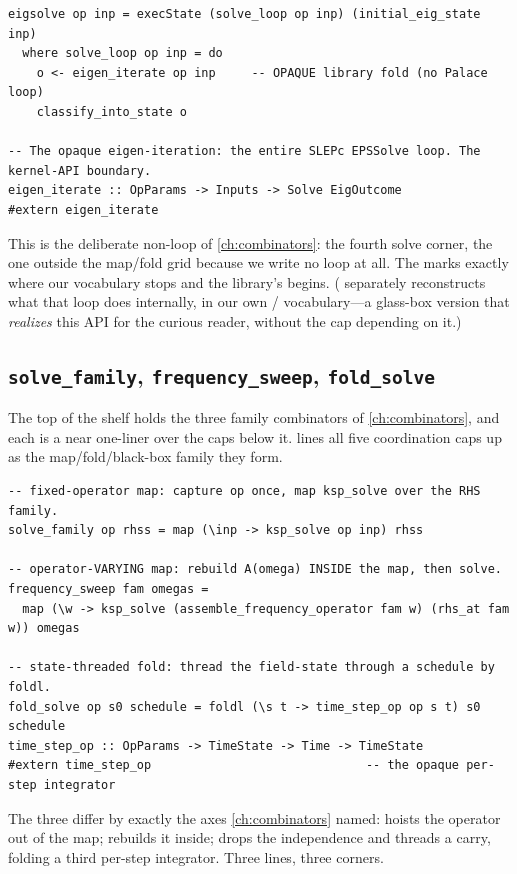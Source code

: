 \begin{lstlisting}[style=l4style]
eigsolve op inp = execState (solve_loop op inp) (initial_eig_state inp)
  where solve_loop op inp = do
    o <- eigen_iterate op inp     -- OPAQUE library fold (no Palace loop)
    classify_into_state o

-- The opaque eigen-iteration: the entire SLEPc EPSSolve loop. The kernel-API boundary.
eigen_iterate :: OpParams -> Inputs -> Solve EigOutcome
#extern eigen_iterate
\end{lstlisting}
This is the deliberate non-loop of \cref{ch:combinators}: the fourth solve corner,
the one outside the map/fold grid because we write no loop at all. The
 marks exactly where our vocabulary stops and the library's begins.
( separately reconstructs what that loop does internally, in our own
/ vocabulary---a glass-box version that
\emph{realizes} this API for the curious reader, without the cap depending on it.)

\subsection{\texttt{solve\_family}, \texttt{frequency\_sweep}, \texttt{fold\_solve}}

The top of the shelf holds the three family combinators of \cref{ch:combinators},
and each is a near one-liner over the caps below it.  lines all five
coordination caps up as the map/fold/black-box family they form.

\begin{lstlisting}[style=l4style]
-- fixed-operator map: capture op once, map ksp_solve over the RHS family.
solve_family op rhss = map (\inp -> ksp_solve op inp) rhss

-- operator-VARYING map: rebuild A(omega) INSIDE the map, then solve.
frequency_sweep fam omegas =
  map (\w -> ksp_solve (assemble_frequency_operator fam w) (rhs_at fam w)) omegas

-- state-threaded fold: thread the field-state through a schedule by foldl.
fold_solve op s0 schedule = foldl (\s t -> time_step_op op s t) s0 schedule
time_step_op :: OpParams -> TimeState -> Time -> TimeState
#extern time_step_op                              -- the opaque per-step integrator
\end{lstlisting}
The three differ by exactly the axes \cref{ch:combinators} named:
 hoists the operator out of the map; 
rebuilds it inside;  drops the independence and threads a carry,
folding a third  per-step integrator. Three lines, three corners.

